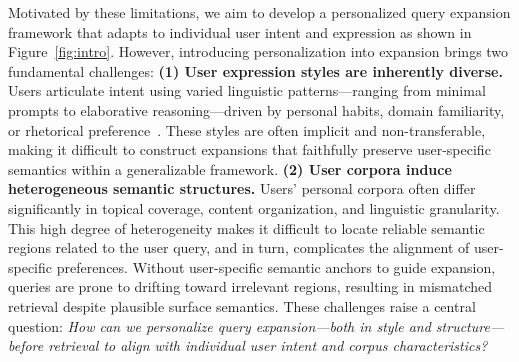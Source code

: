 Motivated by these limitations, we aim to develop a personalized query expansion framework that adapts to individual user intent and expression as shown in Figure~\ref{fig:intro}. However, introducing personalization into expansion brings two fundamental challenges:
\textbf{(1) User expression styles are inherently diverse.}  
Users articulate intent using varied linguistic patterns—ranging from minimal prompts to elaborative reasoning—driven by personal habits, domain familiarity, or rhetorical preference~\cite{neelakanteswara2024rags}. These styles are often implicit and non-transferable, making it difficult to construct expansions that faithfully preserve user-specific semantics within a generalizable framework.
\textbf{(2) User corpora induce heterogeneous semantic structures.} 
Users’ personal corpora often differ significantly in topical coverage, content organization, and linguistic granularity. This high degree of heterogeneity makes it difficult to locate reliable semantic regions related to the user query, and in turn, complicates the alignment of user-specific preferences. Without user-specific semantic anchors to guide expansion, queries are prone to drifting toward irrelevant regions, resulting in mismatched retrieval despite plausible surface semantics.
These challenges raise a central question: \textit{How can we personalize query expansion—both in style and structure—before retrieval to align with individual user intent and corpus characteristics?}

